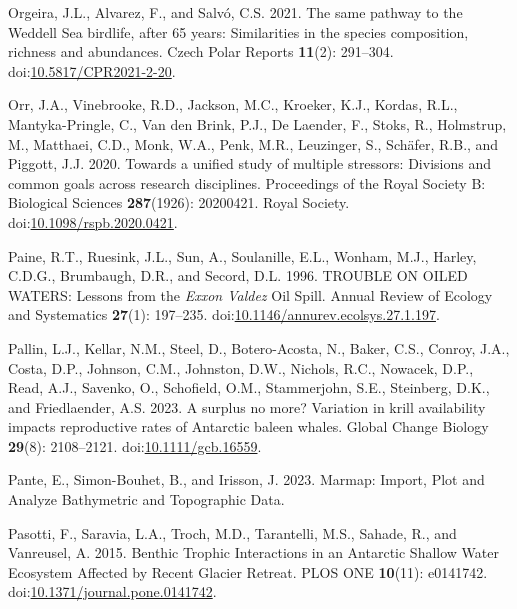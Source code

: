 \documentclass[
]{article}
\newlength{\cslhangindent}
\newenvironment{CSLReferences}[2] %
 {\begin{list}{}{%
  \setlength{\itemindent}{0pt}
  \setlength{\leftmargin}{0pt}
  \setlength{\parsep}{0pt}
  \ifodd #1
   \setlength{\leftmargin}{\cslhangindent}
   \setlength{\itemindent}{-1\cslhangindent}
  \fi
  \setlength{\itemsep}{#2\baselineskip}}}
 {\end{list}}
\begin{document}
\begin{CSLReferences}{1}{0}
Orgeira, J.L., Alvarez, F., and Salvó, C.S. 2021. The same pathway to
the {Weddell Sea} birdlife, after 65 years: Similarities in the species
composition, richness and abundances. Czech Polar Reports
\textbf{11}(2): 291--304.
doi:\href{https://doi.org/10.5817/CPR2021-2-20}{10.5817/CPR2021-2-20}.

Orr, J.A., Vinebrooke, R.D., Jackson, M.C., Kroeker, K.J., Kordas, R.L.,
Mantyka-Pringle, C., Van den Brink, P.J., De Laender, F., Stoks, R.,
Holmstrup, M., Matthaei, C.D., Monk, W.A., Penk, M.R., Leuzinger, S.,
Schäfer, R.B., and Piggott, J.J. 2020. Towards a unified study of
multiple stressors: Divisions and common goals across research
disciplines. Proceedings of the Royal Society B: Biological Sciences
\textbf{287}(1926): 20200421. Royal Society.
doi:\href{https://doi.org/10.1098/rspb.2020.0421}{10.1098/rspb.2020.0421}.

Paine, R.T., Ruesink, J.L., Sun, A., Soulanille, E.L., Wonham, M.J.,
Harley, C.D.G., Brumbaugh, D.R., and Secord, D.L. 1996. {TROUBLE ON
OILED WATERS}: {Lessons} from the {\emph{Exxon Valdez}} {Oil Spill}.
Annual Review of Ecology and Systematics \textbf{27}(1): 197--235.
doi:\href{https://doi.org/10.1146/annurev.ecolsys.27.1.197}{10.1146/annurev.ecolsys.27.1.197}.

Pallin, L.J., Kellar, N.M., Steel, D., Botero-Acosta, N., Baker, C.S.,
Conroy, J.A., Costa, D.P., Johnson, C.M., Johnston, D.W., Nichols, R.C.,
Nowacek, D.P., Read, A.J., Savenko, O., Schofield, O.M., Stammerjohn,
S.E., Steinberg, D.K., and Friedlaender, A.S. 2023. A surplus no more?
{Variation} in krill availability impacts reproductive rates of
{Antarctic} baleen whales. Global Change Biology \textbf{29}(8):
2108--2121.
doi:\href{https://doi.org/10.1111/gcb.16559}{10.1111/gcb.16559}.

Pante, E., Simon-Bouhet, B., and Irisson, J. 2023. Marmap: {Import},
{Plot} and {Analyze Bathymetric} and {Topographic Data}.

Pasotti, F., Saravia, L.A., Troch, M.D., Tarantelli, M.S., Sahade, R.,
and Vanreusel, A. 2015. Benthic {Trophic Interactions} in an {Antarctic
Shallow Water Ecosystem Affected} by {Recent Glacier Retreat}. PLOS ONE
\textbf{10}(11): e0141742.
doi:\href{https://doi.org/10.1371/journal.pone.0141742}{10.1371/journal.pone.0141742}.


\end{CSLReferences}
\end{document}
